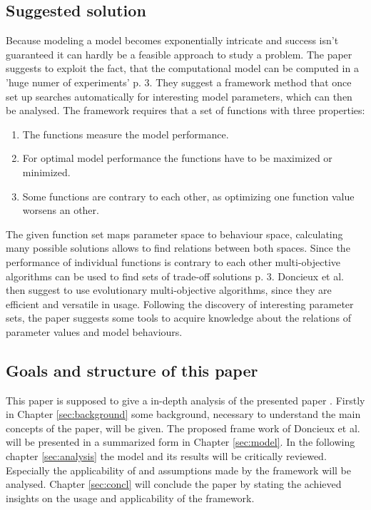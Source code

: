 \documentclass[12pt,twoside]{article}
\theoremstyle{plain}
\theoremstyle{definition}
\theoremstyle{remark}
\begin{document}
\subsection{Suggested solution}
Because modeling a model becomes exponentially intricate and success isn't guaranteed it can hardly be a feasible approach to study a problem. The paper suggests to exploit the fact, that the computational model can be computed in a 'huge numer of experiments' \cite{doncieux2015multi} p. 3.
They suggest a framework method that once set up searches automatically for interesting model parameters, which can then be analysed.
The framework requires that a set of functions with three properties:
\begin{enumerate}
	\item The functions measure the model performance.
	\item For optimal model performance the functions have to be maximized or minimized.
	\item Some functions are contrary to each other, as optimizing one function value worsens an other.
\end{enumerate}
The given function set maps parameter space to behaviour space, calculating many possible solutions allows to find relations between both spaces.
Since the performance of individual functions is contrary to each other multi-objective algorithms can be used to find sets of trade-off solutions \cite{doncieux2015multi} p. 3.
Doncieux et al. then suggest to use evolutionary multi-objective algorithms, since they are efficient and versatile in usage.
Following the discovery of interesting parameter sets, the paper suggests some tools to acquire knowledge about the relations of parameter values and model behaviours.

\subsection{Goals and structure of this paper}
This paper is supposed to give a in-depth analysis of the presented paper \cite{doncieux2015multi}.
Firstly in Chapter \ref{sec:background} some background, necessary to understand the main concepts of the paper, will be given.
The proposed frame work of Doncieux et al. will be presented in a summarized form in Chapter \ref{sec:model}.
In the following chapter \ref{sec:analysis} the model and its results will be critically reviewed.
Especially the applicability of and assumptions made by the framework will be analysed.
Chapter \ref{sec:concl} will conclude the paper by stating the achieved insights on the usage and applicability of the framework. 
\end{document}
